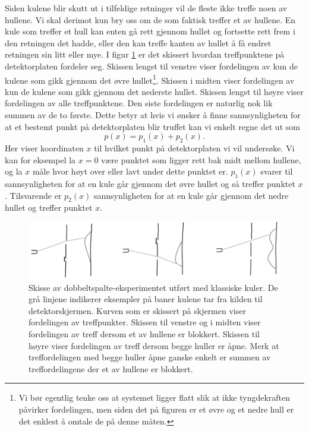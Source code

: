Siden kulene blir skutt ut i tilfeldige retninger vil de fleste ikke treffe noen av hullene. Vi skal derimot kun bry oss om de som faktisk treffer et av hullene. En kule som treffer et hull kan enten gå rett gjennom hullet og fortsette rett frem i den retningen det hadde, eller den kan treffe kanten av hullet å få endret retningen sin litt eller mye. I figur \ref{fig:kvante:klassisktreff} er det skissert hvordan treffpunktene på detektorplaten fordeler seg. Skissen lengst til venstre viser fordelingen av kun de kulene som gikk gjennom det øvre hullet\footnote{Vi bør egentlig tenke oss at systemet ligger flatt slik at ikke tyngdekraften påvirker fordelingen, men siden det på figuren er et øvre og et nedre hull er det enklest å omtale de på denne måten.}. Skissen i midten viser fordelingen av kun de kulene som gikk gjennom det nederste hullet. Skissen lengst til høyre viser fordelingen av alle treffpunktene. Den siste fordelingen er naturlig nok lik summen av de to første. Dette betyr at hvis vi ønsker å finne sannsynligheten for at et bestemt punkt på detektorplaten blir truffet kan vi enkelt regne det ut som
\begin{displaymath}
	p(x) = p_1(x) + p_2(x).
\end{displaymath}
Her viser koordinaten $x$ til hvilket punkt på detektorplaten vi vil undersøke. Vi kan for eksempel la $x=0$ være punktet som ligger rett bak midt mellom hullene, og la $x$ måle hvor høyt over eller lavt under dette punktet er. $p_1(x)$ svarer til sannsynligheten for at en kule går gjennom det øvre hullet og så treffer punktet $x$. Tilsvarende er $p_2(x)$ sannsynligheten for at en kule går gjennom det nedre hullet og treffer punktet $x$. 
\begin{figure}[tp]
	\includegraphics[width=\textwidth]{./dobbeltspalte1}
	\caption{Skisse av dobbeltspalte-eksperimentet utført med klassiske kuler. De grå linjene indikerer eksempler på baner kulene tar fra kilden til detektorskjermen. Kurven som er skissert på skjermen viser fordelingen av treffpunkter. Skissen til venstre og i midten viser fordelingen av treff dersom et av hullene er blokkert. Skissen til høyre viser fordelingen av treff dersom begge huller er åpne. Merk at treffordelingen med begge huller åpne ganske enkelt er summen av treffordelingene der et av hullene er blokkert.}
	\label{fig:kvante:klassisktreff}
\end{figure}

